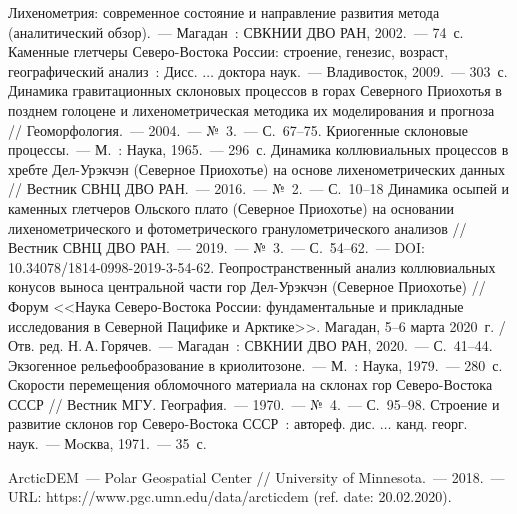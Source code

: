 \begin{thebibliography}{99}
\bibitem{} Лихенометрия: современное состояние и направление развития
метода (аналитический обзор).~--- Магадан~: СВКНИИ ДВО РАН, 2002.~--- 74~с.
\bibitem{} Каменные глетчеры Северо-Востока России: строение, генезис,
возраст, географический анализ~: Дисс. $\dots$ доктора наук.~--- Владивосток, 2009.~--- 303~с.
\bibitem{} Динамика гравитационных склоновых процессов в горах Северного Приохотья в позднем голоцене и лихенометрическая методика их моделирования и прогноза // Геоморфология.~--- 2004.~--- №~3.~--- С.~67--75.
\bibitem{} Криогенные склоновые процессы.~--- М.~: Наука, 1965.~--- 296~с.
\bibitem{} Динамика коллювиальных процессов в хребте Дел-Урэкчэн (Северное Приохотье) на основе лихенометрических данных // Вестник СВНЦ ДВО РАН.~--- 2016.~--- №~2.~--- С.~10--18
\bibitem{} Динамика осыпей и каменных глетчеров Ольского плато (Северное Приохотье) на основании лихенометрического и фотометрического гранулометрического анализов // Вестник СВНЦ ДВО РАН.~--- 2019.~--- №~3.~--- С.~54–62.~--- DOI: 10.34078/1814-0998-2019-3-54-62.
\bibitem{} Геопространственный анализ коллювиальных конусов выноса центральной части гор Дел-Урэкчэн (Северное Приохотье) // Форум <<Наука Северо-Востока России: фундаментальные и прикладные исследования в Северной Пацифике и Арктике>>. Магадан, 5--6 марта 2020~г. / Отв. ред. Н.\,А.\,Горячев.~--- Магадан~: СВКНИИ ДВО РАН, 2020.~--- С.~41--44.
\bibitem{} Экзогенное рельефообразование в криолитозоне.~--- М.~:
Наука, 1979.~--- 280~с.
\bibitem{} Скорости перемещения обломочного материала на склонах гор
Северо-Востока СССР // Вестник МГУ. География.~--- 1970.~--- №~4.~--- С.~95--98.
\bibitem{} Строение и развитие склонов гор Северо-Востока СССР~: автореф.
дис. $\dots$ канд. георг. наук.~--- Мoсква, 1971.~--- 35~с.

\bibitem{}ArcticDEM~--- Polar Geospatial Center // University of Minnesota.~--- 2018.~--- URL: https://www.pgc.umn.edu/\-data/arcticdem (ref. date: 20.02.2020).

\end{thebibliography}
\thispagestyle{empty}
